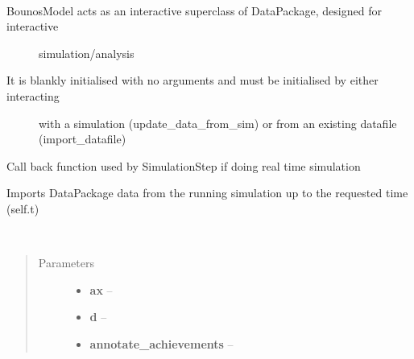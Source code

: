 \documentclass[letterpaper,10pt,english]{sphinxmanual}
\begin{document}
\begin{fulllineitems}
\label{index:bounos.BounosModel}~\begin{description}
\item[{BounosModel acts as an interactive superclass of DataPackage, designed for interactive}] \leavevmode
simulation/analysis

\item[{It is blankly initialised with no arguments and must be initialised by either interacting}] \leavevmode
with a simulation (update\_data\_from\_sim) or from an existing datafile (import\_datafile)

\end{description}

\begin{fulllineitems}
\label{index:bounos.BounosModel.update_data_from_sim}
Call back function used by SimulationStep if doing real time simulation

Imports DataPackage data from the running simulation up to the requested time (self.t)

\end{fulllineitems}


\end{fulllineitems}


\begin{fulllineitems}
\label{index:bounos.add_achievements}~\begin{quote}\begin{description}
\item[{Parameters}] \leavevmode\begin{itemize}
\item {} 
\textbf{ax} -- 

\item {} 
\textbf{d} -- 

\item {} 
\textbf{annotate\_achievements} -- 

\end{itemize}

\end{description}\end{quote}

\end{fulllineitems}
\end{document}
